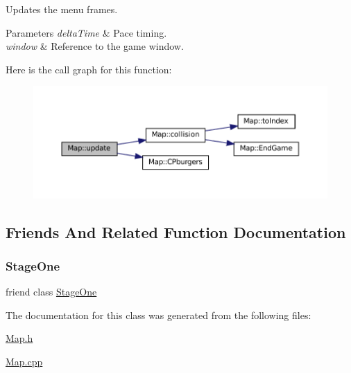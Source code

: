 Updates the menu frames. 


\begin{DoxyParams}{Parameters}
{\em delta\+Time} & Pace timing. \\
\hline
{\em window} & Reference to the game window. \\
\hline
\end{DoxyParams}
Here is the call graph for this function\+:\nopagebreak
\begin{figure}[H]
\begin{center}
\leavevmode
\includegraphics[width=350pt]{classMap_a7346023f96a36368daa2d4cafd4523f2_cgraph}
\end{center}
\end{figure}


\subsection{Friends And Related Function Documentation}
\mbox{\label{classMap_a8a97b6d5e408db103798551949a4e1f8}} 
\subsubsection{\texorpdfstring{Stage\+One}{StageOne}}
{\footnotesize\ttfamily friend class \mbox{\hyperlink{classStageOne}{Stage\+One}}\hspace{0.3cm}{\ttfamily [friend]}}



The documentation for this class was generated from the following files\+:\begin{DoxyCompactItemize}
\item 
\mbox{\hyperlink{Map_8h}{Map.\+h}}\item 
\mbox{\hyperlink{Map_8cpp}{Map.\+cpp}}\end{DoxyCompactItemize}
